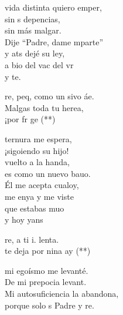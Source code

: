 \begin{cancion}%
	 vida distinta quiero emper,\\
	sin s depencias,\\
	sin más malgar.\\
	Dije “Padre, dame mparte” \\
	y ats dejé su ley, \\
	a bio del vac del vr \\
	y  te.\jump\\
	\begin{chorus}%
		re, peq, como un sivo áe. \\
		Malgas toda tu herea,\\
		¡por fr ge (**) \jump\\
	\end{chorus}%
	 ternura me espera, \\
	¡sigoiendo su hijo!\\
	vuelto a la handa,\\
	es como un nuevo bauo.\\
	Él me acepta cualoy,\\
	me enya y me viste\\
	que estabas muo \\
	y hoy yans\jump\\
	\begin{chorus}%
		re, a ti i.  lenta\chord{si}{m}{ré}. \\
		te deja por nina ay (**)\jump\\
	\end{chorus}%
	mi egoísmo me levanté.\\
	De mi prepocia levant. \\
	Mi autosuficiencia la abandona,  \\
	porque solo s Padre y re. \\
\end{cancion}%
